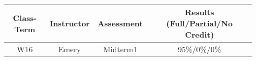 \begin{outcomes}
	\begin{center}
		\begin{tabular}{cccc}
			\hline\hline
                Class-Term & Instructor & Assessment & Results (Full/Partial/No Credit) \\
			\hline
                W16 & Emery & Midterm1 & 95\%/0\%/0\%\\
			\hline
		\end{tabular}
	\end{center}
\end{outcomes}

\begin{comments}
	
\end{comments}
